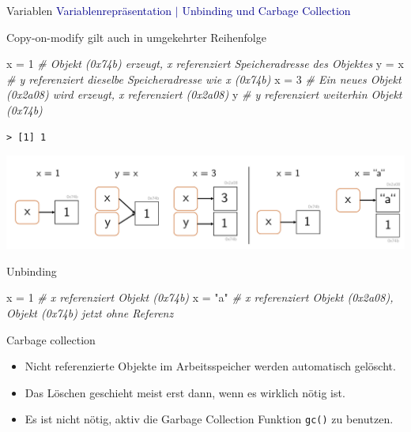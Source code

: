 \documentclass[
  8pt,
  ignorenonframetext,
]{beamer}
\newenvironment{Shaded}{\begin{snugshade}}{\end{snugshade}}
\newcommand{\CommentTok}[1]{\textcolor[rgb]{0.56,0.35,0.01}{\textit{#1}}}
\newcommand{\DecValTok}[1]{\textcolor[rgb]{0.00,0.00,0.81}{#1}}
\newcommand{\NormalTok}[1]{#1}
\newcommand{\OtherTok}[1]{\textcolor[rgb]{0.56,0.35,0.01}{#1}}
\newcommand{\StringTok}[1]{\textcolor[rgb]{0.31,0.60,0.02}{#1}}
\providecommand{\tightlist}{%
  \setlength{\itemsep}{0pt}\setlength{\parskip}{0pt}}
\begin{document}
\begin{frame}[fragile]{Variablen}
\protect\hypertarget{variablen-9}{}
\textcolor{darkblue}{Variablenrepräsentation $\vert$ Unbinding und Carbage Collection}
\small

Copy-on-modify gilt auch in umgekehrter Reihenfolge

\footnotesize

\begin{Shaded}
\begin{Highlighting}[]
\NormalTok{x }\OtherTok{=} \DecValTok{1}       \CommentTok{\# Objekt (0x74b) erzeugt, x referenziert Speicheradresse  des Objektes}
\NormalTok{y }\OtherTok{=}\NormalTok{ x       }\CommentTok{\# y referenziert dieselbe Speicheradresse wie x (0x74b)}
\NormalTok{x }\OtherTok{=} \DecValTok{3}       \CommentTok{\# Ein neues Objekt (0x2a08) wird erzeugt, x referenziert (0x2a08)}
\NormalTok{y           }\CommentTok{\# y referenziert weiterhin  Objekt (0x74b)}
\end{Highlighting}
\end{Shaded}

\begin{verbatim}
> [1] 1
\end{verbatim}

\begin{center}\includegraphics[width=0.56\linewidth]{2_Abbildungen/pds_2_unbinding} \end{center}
\vspace{-2mm}
\small

Unbinding \footnotesize

\begin{Shaded}
\begin{Highlighting}[]
\NormalTok{x }\OtherTok{=} \DecValTok{1}       \CommentTok{\#  x referenziert Objekt (0x74b)}
\NormalTok{x }\OtherTok{=} \StringTok{"a"}     \CommentTok{\#  x referenziert Objekt (0x2a08), Objekt (0x74b) jetzt ohne Referenz}
\end{Highlighting}
\end{Shaded}

\small

Carbage collection \footnotesize

\begin{itemize}
\tightlist
\item
  Nicht referenzierte Objekte im Arbeitsspeicher werden automatisch
  gelöscht.
\item
  Das Löschen geschieht meist erst dann, wenn es wirklich nötig ist.
\item
  Es ist nicht nötig, aktiv die Garbage Collection Funktion
  \texttt{gc()} zu benutzen.
\end{itemize}
\end{frame}
\end{document}
